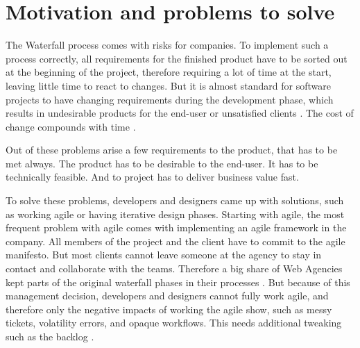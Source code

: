 \section*{Motivation and problems to solve}

The Waterfall process comes with risks for companies. To implement such a process correctly, all requirements for the finished product have to be sorted out at the beginning of the project, therefore requiring a lot of time at the start, leaving little time to react to changes. But it is almost standard for software projects to have changing requirements during the development phase, which results in undesirable products for the end-user or unsatisfied clients \cite[p. 14]{ratcliffe2011agile}. The cost of change compounds with time \cite[p. 22]{ratcliffe2011agile}.

Out of these problems arise a few requirements to the product, that has to be met always. The product has to be desirable to the end-user. It has to be technically feasible. And to project has to deliver business value fast.

To solve these problems, developers and designers came up with solutions, such as working agile or having iterative design phases. Starting with agile, the most frequent problem with agile comes with implementing an agile framework in the company. All members of the project and the client have to commit to the agile manifesto. But most clients cannot leave someone at the agency to stay in contact and collaborate with the teams. Therefore a big share of Web Agencies kept parts of the original waterfall phases in their processes \citep{10spanne26:online}. But because of this management decision, developers and designers cannot fully work agile, and therefore only the negative impacts of working the agile show, such as messy tickets, volatility errors, and opaque workflows. This needs additional tweaking such as the backlog \citep{nakao2014using}.

